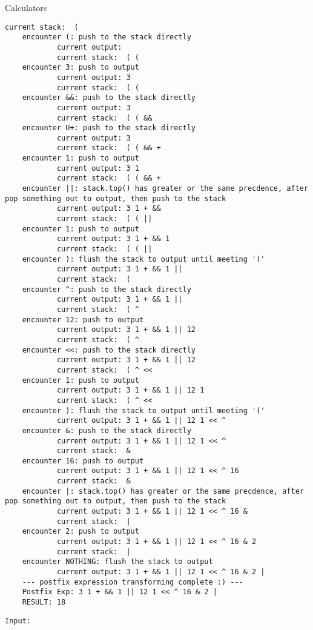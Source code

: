 \begin{homeworkProblem}{Calculators}
\begin{lstlisting}[breaklines=true]
            current stack:  (
    encounter (: push to the stack directly
            current output:
            current stack:  ( (
    encounter 3: push to output
            current output: 3
            current stack:  ( (
    encounter &&: push to the stack directly
            current output: 3
            current stack:  ( ( &&
    encounter U+: push to the stack directly
            current output: 3
            current stack:  ( ( && +
    encounter 1: push to output
            current output: 3 1
            current stack:  ( ( && +
    encounter ||: stack.top() has greater or the same precdence, after pop something out to output, then push to the stack
            current output: 3 1 + &&
            current stack:  ( ( ||
    encounter 1: push to output
            current output: 3 1 + && 1
            current stack:  ( ( ||
    encounter ): flush the stack to output until meeting '('
            current output: 3 1 + && 1 ||
            current stack:  (
    encounter ^: push to the stack directly
            current output: 3 1 + && 1 ||
            current stack:  ( ^
    encounter 12: push to output
            current output: 3 1 + && 1 || 12
            current stack:  ( ^
    encounter <<: push to the stack directly
            current output: 3 1 + && 1 || 12
            current stack:  ( ^ <<
    encounter 1: push to output
            current output: 3 1 + && 1 || 12 1
            current stack:  ( ^ <<
    encounter ): flush the stack to output until meeting '('
            current output: 3 1 + && 1 || 12 1 << ^
    encounter &: push to the stack directly
            current output: 3 1 + && 1 || 12 1 << ^
            current stack:  &
    encounter 16: push to output
            current output: 3 1 + && 1 || 12 1 << ^ 16
            current stack:  &
    encounter |: stack.top() has greater or the same precdence, after pop something out to output, then push to the stack
            current output: 3 1 + && 1 || 12 1 << ^ 16 &
            current stack:  |
    encounter 2: push to output
            current output: 3 1 + && 1 || 12 1 << ^ 16 & 2
            current stack:  |
    encounter NOTHING: flush the stack to output
            current output: 3 1 + && 1 || 12 1 << ^ 16 & 2 |
    --- postfix expression transforming complete :) ---
    Postfix Exp: 3 1 + && 1 || 12 1 << ^ 16 & 2 |
    RESULT: 18
    \end{lstlisting}


    \begin{lstlisting}[breaklines=true]
    Input:


\end{lstlisting}
\end{homeworkProblem}
